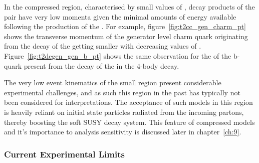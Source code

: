 In the compressed region, characterised by small values of \deltam, decay
products of the \sTop pair have very low momenta given the minimal amounts of
energy available following the production of the \chiz. For example, 
figure~\ref{fig:t2cc_gen_charm_pt} shows the transverse momentum of the
generator level charm quark originating from the decay of the \sTop getting
smaller
with decreasing values of \deltam. Figure~\ref{fig:t2degen_gen_b_pt} shows the
same observation for the \Pt of the b-quark present from the decay of the
\sTop in the 4-body decay.

The very low event kinematics of the small \deltam region present considerable
experimental challenges, and as such this region in the past has typically not
been considered for interpretations. The acceptance of such models in this
region is heavily reliant on initial state particles radiated from the
incoming partons, thereby boosting the soft SUSY decay system. This feature of
compressed models and it's importance to analysis sensitivity is discussed
later in chapter~\ref{ch:9}.

\subsubsection{Current Experimental Limits}

